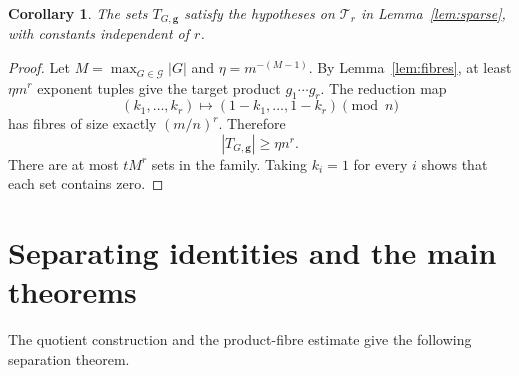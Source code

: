 \documentclass[11pt,reqno]{amsart}
\newtheorem{corollary}[theorem]{Corollary}
\theoremstyle{definition}
\numberwithin{equation}{section}
\newcommand{\calG}{\mathcal{G}}
\renewcommand{\geq}{\geqslant}
\begin{document}
\begin{corollary}\label{cor:dense}
The sets $T_{G,\boldsymbol{g}}$ satisfy the hypotheses on $\mathcal{T}_r$ in Lemma~\ref{lem:sparse}, with constants independent of $r$.
\end{corollary}
\begin{proof}
Let $M=\max_{G\in\calG}|G|$ and $\eta=m^{-(M-1)}$. By Lemma~\ref{lem:fibres}, at least $\eta m^r$ exponent tuples give the target product $g_1\cdots g_r$. The reduction map
\[
 (k_1,\ldots,k_r)\longmapsto(1-k_1,\ldots,1-k_r)\pmod n
\]
has fibres of size exactly $(m/n)^r$. Therefore
\[
 |T_{G,\boldsymbol{g}}|\geq\eta n^r.
\]
There are at most $tM^r$ sets in the family. Taking $k_i=1$ for every $i$ shows that each set contains zero.
\end{proof}

\section{Separating identities and the main theorems}\label{sec:separation}
The quotient construction and the product-fibre estimate give the following separation theorem.
\end{document}

